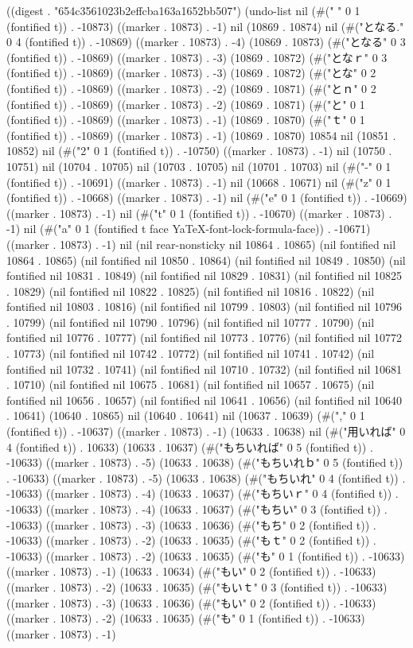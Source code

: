 
((digest . "654c3561023b2effcba163a1652bb507") (undo-list nil (#(" " 0 1 (fontified t)) . -10873) ((marker . 10873) . -1) nil (10869 . 10874) nil (#("となる." 0 4 (fontified t)) . -10869) ((marker . 10873) . -4) (10869 . 10873) (#("となる" 0 3 (fontified t)) . -10869) ((marker . 10873) . -3) (10869 . 10872) (#("となｒ" 0 3 (fontified t)) . -10869) ((marker . 10873) . -3) (10869 . 10872) (#("とな" 0 2 (fontified t)) . -10869) ((marker . 10873) . -2) (10869 . 10871) (#("とｎ" 0 2 (fontified t)) . -10869) ((marker . 10873) . -2) (10869 . 10871) (#("と" 0 1 (fontified t)) . -10869) ((marker . 10873) . -1) (10869 . 10870) (#("ｔ" 0 1 (fontified t)) . -10869) ((marker . 10873) . -1) (10869 . 10870) 10854 nil (10851 . 10852) nil (#("2" 0 1 (fontified t)) . -10750) ((marker . 10873) . -1) nil (10750 . 10751) nil (10704 . 10705) nil (10703 . 10705) nil (10701 . 10703) nil (#("-" 0 1 (fontified t)) . -10691) ((marker . 10873) . -1) nil (10668 . 10671) nil (#("z" 0 1 (fontified t)) . -10668) ((marker . 10873) . -1) nil (#("e" 0 1 (fontified t)) . -10669) ((marker . 10873) . -1) nil (#("t" 0 1 (fontified t)) . -10670) ((marker . 10873) . -1) nil (#("a" 0 1 (fontified t face YaTeX-font-lock-formula-face)) . -10671) ((marker . 10873) . -1) nil (nil rear-nonsticky nil 10864 . 10865) (nil fontified nil 10864 . 10865) (nil fontified nil 10850 . 10864) (nil fontified nil 10849 . 10850) (nil fontified nil 10831 . 10849) (nil fontified nil 10829 . 10831) (nil fontified nil 10825 . 10829) (nil fontified nil 10822 . 10825) (nil fontified nil 10816 . 10822) (nil fontified nil 10803 . 10816) (nil fontified nil 10799 . 10803) (nil fontified nil 10796 . 10799) (nil fontified nil 10790 . 10796) (nil fontified nil 10777 . 10790) (nil fontified nil 10776 . 10777) (nil fontified nil 10773 . 10776) (nil fontified nil 10772 . 10773) (nil fontified nil 10742 . 10772) (nil fontified nil 10741 . 10742) (nil fontified nil 10732 . 10741) (nil fontified nil 10710 . 10732) (nil fontified nil 10681 . 10710) (nil fontified nil 10675 . 10681) (nil fontified nil 10657 . 10675) (nil fontified nil 10656 . 10657) (nil fontified nil 10641 . 10656) (nil fontified nil 10640 . 10641) (10640 . 10865) nil (10640 . 10641) nil (10637 . 10639) (#("," 0 1 (fontified t)) . -10637) ((marker . 10873) . -1) (10633 . 10638) nil (#("用いれば" 0 4 (fontified t)) . 10633) (10633 . 10637) (#("もちいれば" 0 5 (fontified t)) . -10633) ((marker . 10873) . -5) (10633 . 10638) (#("もちいれｂ" 0 5 (fontified t)) . -10633) ((marker . 10873) . -5) (10633 . 10638) (#("もちいれ" 0 4 (fontified t)) . -10633) ((marker . 10873) . -4) (10633 . 10637) (#("もちいｒ" 0 4 (fontified t)) . -10633) ((marker . 10873) . -4) (10633 . 10637) (#("もちい" 0 3 (fontified t)) . -10633) ((marker . 10873) . -3) (10633 . 10636) (#("もち" 0 2 (fontified t)) . -10633) ((marker . 10873) . -2) (10633 . 10635) (#("もｔ" 0 2 (fontified t)) . -10633) ((marker . 10873) . -2) (10633 . 10635) (#("も" 0 1 (fontified t)) . -10633) ((marker . 10873) . -1) (10633 . 10634) (#("もい" 0 2 (fontified t)) . -10633) ((marker . 10873) . -2) (10633 . 10635) (#("もいｔ" 0 3 (fontified t)) . -10633) ((marker . 10873) . -3) (10633 . 10636) (#("もい" 0 2 (fontified t)) . -10633) ((marker . 10873) . -2) (10633 . 10635) (#("も" 0 1 (fontified t)) . -10633) ((marker . 10873) . -1) 